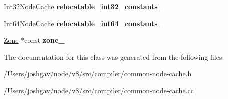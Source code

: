 \begin{DoxyCompactItemize}
\item 
\hyperlink{classv8_1_1internal_1_1compiler_1_1_node_cache}{Int32\+Node\+Cache} {\bfseries relocatable\+\_\+int32\+\_\+constants\+\_\+}\hypertarget{classv8_1_1internal_1_1compiler_1_1_common_node_cache_ae5094a350d99dc762f05715bfa9d2a04}{}\label{classv8_1_1internal_1_1compiler_1_1_common_node_cache_ae5094a350d99dc762f05715bfa9d2a04}

\item 
\hyperlink{classv8_1_1internal_1_1compiler_1_1_node_cache}{Int64\+Node\+Cache} {\bfseries relocatable\+\_\+int64\+\_\+constants\+\_\+}\hypertarget{classv8_1_1internal_1_1compiler_1_1_common_node_cache_a2aecd29b94c20b174081eaa390b5d462}{}\label{classv8_1_1internal_1_1compiler_1_1_common_node_cache_a2aecd29b94c20b174081eaa390b5d462}

\item 
\hyperlink{classv8_1_1internal_1_1_zone}{Zone} $\ast$const {\bfseries zone\+\_\+}\hypertarget{classv8_1_1internal_1_1compiler_1_1_common_node_cache_a8b00b8f4da8bb3630fb8280dc92afe81}{}\label{classv8_1_1internal_1_1compiler_1_1_common_node_cache_a8b00b8f4da8bb3630fb8280dc92afe81}

\end{DoxyCompactItemize}


The documentation for this class was generated from the following files\+:\begin{DoxyCompactItemize}
\item 
/\+Users/joshgav/node/v8/src/compiler/common-\/node-\/cache.\+h\item 
/\+Users/joshgav/node/v8/src/compiler/common-\/node-\/cache.\+cc\end{DoxyCompactItemize}
